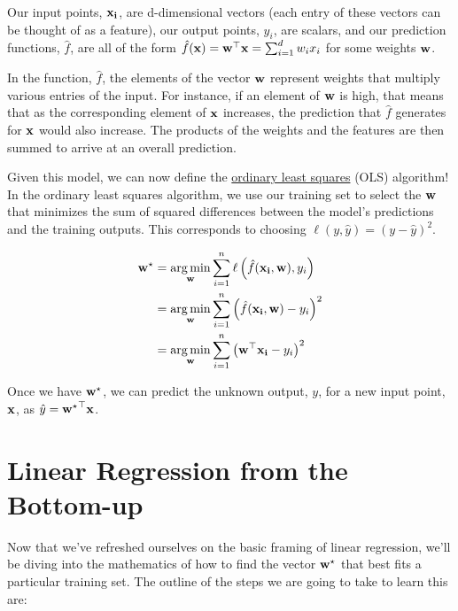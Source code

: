 \documentclass[assignment02_Solutions]{subfiles}
\begin{document}
\begin{recall}

Our input points, $\mathbf{x_i}$, are d-dimensional vectors (each entry of these vectors can be thought of as a feature), our output points, $y_i$, are scalars, and our prediction functions, $\hat{f}$, are all of the form $\hat{f}(\mathbf{x}) = \mathbf{w}^\top \mathbf{x} = \sum_{i=1}^d w_i x_i$ for some weights $\mathbf{w}$.

In the function, $\hat{f}$, the elements of the vector $\mathbf{w}$ represent weights that multiply various entries of the input.  For instance, if an element of $\mathbf{w}$ is high, that means that as the corresponding element of $\mathbf{x}$ increases, the prediction that $\hat{f}$ generates for $\mathbf{x}$ would also increase.  The products of the weights and the features are then summed to arrive at an overall prediction.

Given this model, we can now define the \href{https://en.wikipedia.org/wiki/Ordinary_least_squares}{ordinary least squares} (OLS) algorithm!  In the ordinary least squares algorithm, we use our training set to select the $\mathbf{w}$ that minimizes the sum of squared differences between the model's predictions and the training outputs.  This corresponds to choosing $\ell(y, \hat{y}) = (y - \hat{y})^2$.

\begin{align}
\mathbf{w}^\star &= \operatorname*{arg\,min}_{\mathbf{w}} \sum_{i=1}^n \ell \left ( \hat{f}(\mathbf{x_i}, \mathbf{w}) , y_i \right) \\
&= \operatorname*{arg\,min}_{\mathbf{w}} \sum_{i=1}^n \left ( \hat{f}(\mathbf{x_i}, \mathbf{w}) - y_i \right)^2 \\
&= \operatorname*{arg\,min}_{\mathbf{w}} \sum_{i=1}^n \left ( \mathbf{w}^\top \mathbf{x_i} - y_i \right)^2
\end{align}

Once we have $\mathbf{w}^\star$, we can predict the unknown output, $y$, for a new input point, $\mathbf{x}$, as $\hat{y} = \mathbf{w^\star}^\top \mathbf{x}$.
\end{recall}

\section{Linear Regression from the Bottom-up}

Now that we've refreshed ourselves on the basic framing of linear regression, we'll be diving into the mathematics of how to find the vector $\mathbf{w}^\star$ that best fits a particular training set.  The outline of the steps we are going to take to learn this are:
\end{document}
